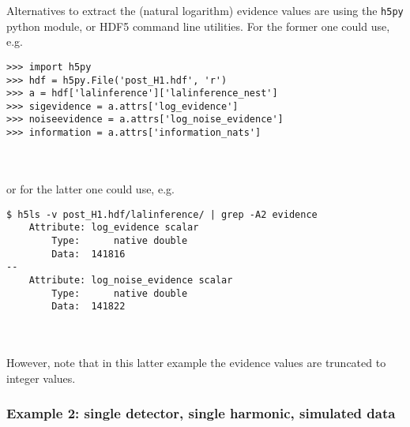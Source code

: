 Alternatives to extract the (natural logarithm) evidence values are using the {\tt h5py} python module, or HDF5 command line utilities. For the former one could
use, e.g.\
\begin{lrbox}{\Lst}
\begin{lstlisting}
>>> import h5py
>>> hdf = h5py.File('post_H1.hdf', 'r')
>>> a = hdf['lalinference']['lalinference_nest']
>>> sigevidence = a.attrs['log_evidence']
>>> noiseevidence = a.attrs['log_noise_evidence']
>>> information = a.attrs['information_nats']
\end{lstlisting}
\end{lrbox}
\\[5pt] \indent \fbox{\usebox{\Lst}} \\[5pt]
or for the latter one could use, e.g.\
\begin{lrbox}{\Lst}
\begin{lstlisting}
$ h5ls -v post_H1.hdf/lalinference/ | grep -A2 evidence
    Attribute: log_evidence scalar
        Type:      native double
        Data:  141816
--
    Attribute: log_noise_evidence scalar
        Type:      native double
        Data:  141822
\end{lstlisting}
\end{lrbox}
\\[5pt] \indent \fbox{\usebox{\Lst}} \\[5pt]
However, note that in this latter example the evidence values are truncated to integer values.

\subsubsection{Example 2: single detector, single harmonic, simulated data}\label{sec:example2}

